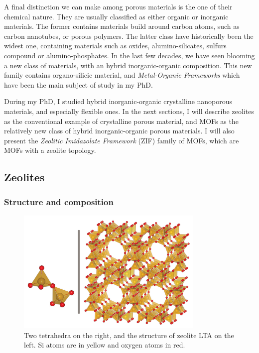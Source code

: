 \documentclass[thesis]{subfiles}
\begin{document}
A final distinction we can make among porous materials is the one of their
chemical nature. They are usually classified as either organic or inorganic
materials. The former contains materials build around carbon atoms, such as
carbon nanotubes, or porous polymers. The latter class have historically been
the widest one, containing materials such as oxides, alumino-silicates, sulfurs
compound or alumino-phosphates. In the last few decades, we have seen blooming a
new class of materials, with an hybrid inorganic-organic composition. This new
family contains organo-silicic material, and \emph{Metal-Organic Frameworks}
which have been the main subject of study in my PhD.

During my PhD, I studied hybrid inorganic-organic crystalline nanoporous
materials, and especially flexible ones. In the next sections, I will describe
zeolites as the conventional example of crystalline porous material, and MOFs as
the relatively new class of hybrid inorganic-organic porous materials. I will
also present the \emph{Zeolitic Imidazolate Framework} (ZIF) family of MOFs,
which are MOFs with a zeolite topology.

\subsection{Zeolites}
\subsubsection{Structure and composition}

\begin{figure}[ht]
    \centering
    \includegraphics[width=0.8\textwidth]{figures/images/zeolite-building-blocks}
    \caption{Two  tetrahedra on the right, and the structure of zeolite
    LTA on the left. Si atoms are in yellow and oxygen atoms in red.}
    \label{fig:zeolite-building-block}
\end{figure}
\end{document}
